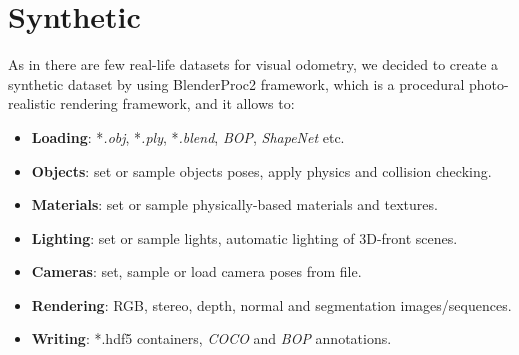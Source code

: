 
\section{Synthetic}\label{sec:synthetic}

As in there are few real-life datasets for visual odometry, we decided to create a synthetic dataset by using BlenderProc2 framework,
which is a procedural photo-realistic rendering framework, and it allows to:
\begin{itemize}
    \item \textbf{Loading}: *\textit{.obj}, *\textit{.ply}, *\textit{.blend}, \textit{BOP}, \textit{ShapeNet} etc.
    \item \textbf{Objects}: set or sample objects poses, apply physics and collision checking.
    \item \textbf{Materials}: set or sample physically-based materials and textures.
    \item \textbf{Lighting}: set or sample lights, automatic lighting of 3D-front scenes.
    \item \textbf{Cameras}: set, sample or load camera poses from file.
    \item \textbf{Rendering}: RGB, stereo, depth, normal and segmentation images/sequences.
    \item \textbf{Writing}: *.hdf5 containers, \textit{COCO} and \textit{BOP} annotations.
\end{itemize}

